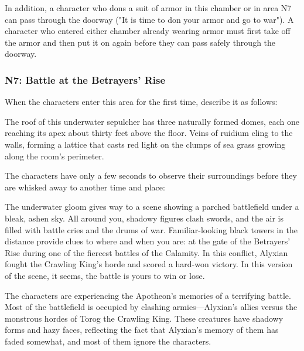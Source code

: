 \documentclass[a4paper, 11pt, bg=full, twocolumn, nooutline]{dndbook}
\begin{document}
In addition, a character who dons a suit of armor in this chamber or in area N7 can pass through the doorway ("It is time to don your armor and go to war"). A character who entered either chamber already wearing armor must first take off the armor and then put it on again before they can pass safely through the doorway.


\subsubsection{N7: Battle at the Betrayers' Rise}

When the characters enter this area for the first time, describe it as follows:

\begin{DndReadAloud}
The roof of this underwater sepulcher has three naturally formed domes, each one reaching its apex about thirty feet above the floor. Veins of ruidium cling to the walls, forming a lattice that casts red light on the clumps of sea grass growing along the room's perimeter.
\end{DndReadAloud}

The characters have only a few seconds to observe their surroundings before they are whisked away to another time and place:

\begin{DndReadAloud}
The underwater gloom gives way to a scene showing a parched battlefield under a bleak, ashen sky. All around you, shadowy figures clash swords, and the air is filled with battle cries and the drums of war.
Familiar-looking black towers in the distance provide clues to where and when you are: at the gate of the Betrayers' Rise during one of the fiercest battles of the Calamity. In this conflict, Alyxian fought the Crawling King's horde and scored a hard-won victory. In this version of the scene, it seems, the battle is yours to win or lose.
\end{DndReadAloud}

The characters are experiencing the Apotheon's memories of a terrifying battle. Most of the battlefield is occupied by clashing armies---Alyxian's allies versus the monstrous hordes of Torog the Crawling King. These creatures have shadowy forms and hazy faces, reflecting the fact that Alyxian's memory of them has faded somewhat, and most of them ignore the characters.
\end{document}
